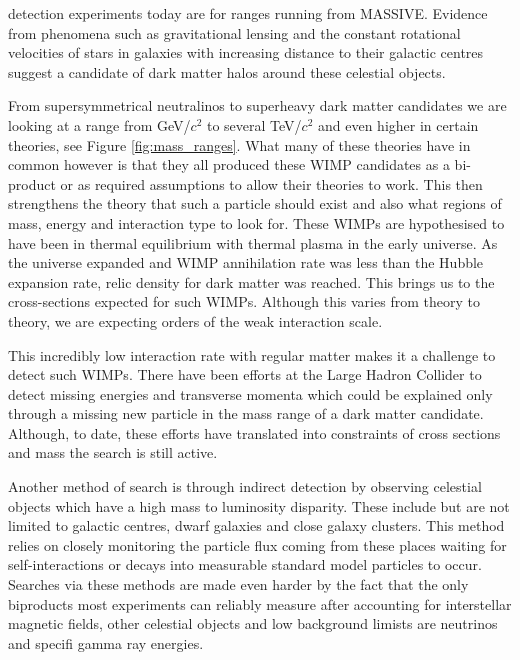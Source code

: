 \documentclass[11pt]{article} %
\begin{document}
detection experiments today are for ranges running from MASSIVE.
Evidence from phenomena such as gravitational lensing and the constant rotational velocities of stars in galaxies with increasing
distance to their galactic centres suggest a candidate of dark matter halos around these celestial objects.
\\
\par From supersymmetrical neutralinos to superheavy dark matter candidates we are looking at a range from GeV/$c^2$ to several TeV/$c^2$ and even higher in certain theories, see Figure \ref{fig:mass_ranges}.
What many of these theories have in common however is that they all produced these WIMP candidates as a bi-product or as required assumptions
to allow their theories to work.
This then strengthens the theory that such a particle should exist and also what regions of mass, energy and interaction type to look for.
These WIMPs are hypothesised to have been in thermal equilibrium with thermal plasma in the early universe.
As the universe expanded and WIMP annihilation rate was less than the Hubble expansion rate, relic density for dark matter was reached.
This brings us to the cross-sections expected for such WIMPs.
Although this varies from theory to theory, we are expecting orders of the weak interaction scale.
\\
\par This incredibly low interaction rate with regular matter makes it a challenge to detect such WIMPs.
There have been efforts at the Large Hadron Collider to detect missing energies and transverse momenta which could be
explained only through a missing new particle in the mass range of a dark matter candidate.
Although, to date, these efforts have translated into constraints of cross sections and mass the search is still active.
\\
\par Another method of search is through indirect detection by observing celestial objects which have a high mass to luminosity disparity.
These include but are not limited to galactic centres, dwarf galaxies and close galaxy clusters.
This method relies on closely monitoring the particle flux coming from these places waiting for self-interactions or decays into measurable standard model particles to occur.
Searches via these methods are made even harder by the fact that the only biproducts most experiments can reliably measure after accounting
for interstellar magnetic fields, other celestial objects and low background limists are neutrinos and specifi gamma ray energies.
\\
\end{document}
